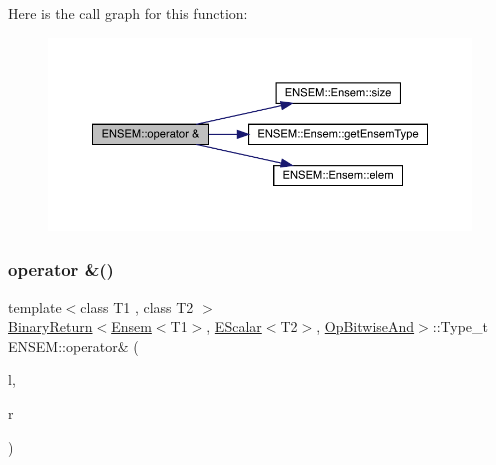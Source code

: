 Here is the call graph for this function\+:\nopagebreak
\begin{figure}[H]
\begin{center}
\leavevmode
\includegraphics[width=350pt]{d1/d9e/group__eensem_gaeb51787a8e99aa2d96b292b6b53160fb_cgraph}
\end{center}
\end{figure}
\mbox{\label{group__eensem_gadd38c6dbde8cad60658e2a3429480978}} 
\subsubsection{\texorpdfstring{operator \&()}{operator \&()}\hspace{0.1cm}{\footnotesize\ttfamily [2/3]}}
{\footnotesize\ttfamily template$<$class T1 , class T2 $>$ \\
\mbox{\hyperlink{structENSEM_1_1BinaryReturn}{Binary\+Return}}$<$\mbox{\hyperlink{classENSEM_1_1Ensem}{Ensem}}$<$T1$>$, \mbox{\hyperlink{classENSEM_1_1EScalar}{E\+Scalar}}$<$T2$>$, \mbox{\hyperlink{structENSEM_1_1OpBitwiseAnd}{Op\+Bitwise\+And}}$>$\+::Type\+\_\+t E\+N\+S\+E\+M\+::operator\& (\begin{DoxyParamCaption}\item[{const \mbox{\hyperlink{classENSEM_1_1Ensem}{Ensem}}$<$ T1 $>$ \&}]{l,  }\item[{const \mbox{\hyperlink{classENSEM_1_1EScalar}{E\+Scalar}}$<$ T2 $>$ \&}]{r }\end{DoxyParamCaption})\hspace{0.3cm}{\ttfamily [inline]}}

